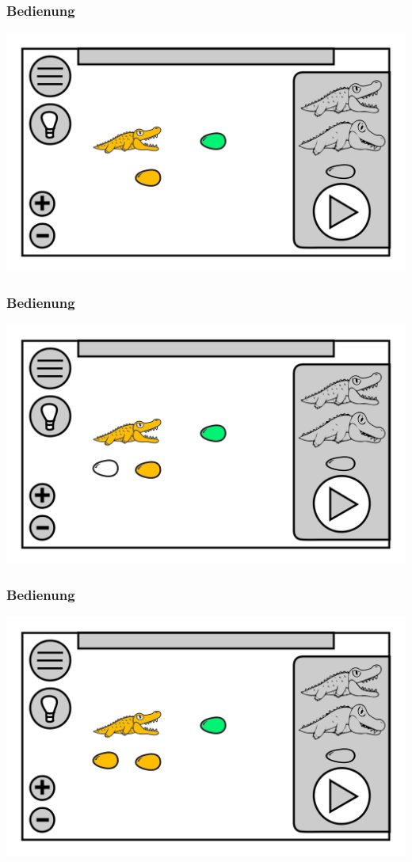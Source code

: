 \documentclass[t]{beamer}
\begin{document}
\begin{frame}
	\frametitle{Bedienung}
	\includegraphics[height=\textheight]{level_colored_croc01.png}
\end{frame}
\begin{frame}
	\frametitle{Bedienung}
	\includegraphics[height=\textheight]{level_colored_croc1.png}
\end{frame}
\begin{frame}
	\frametitle{Bedienung}
	\includegraphics[height=\textheight]{level_colored_croc2.png}
\end{frame}
\end{document}
